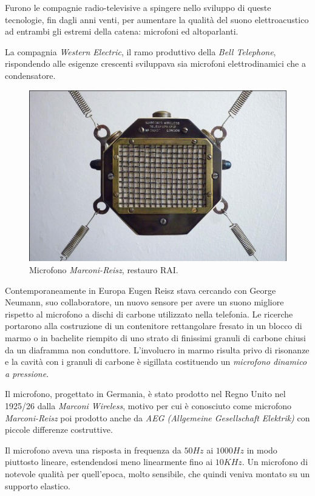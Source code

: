 \begin{refsection}
Furono le compagnie radio-televisive a spingere nello sviluppo di queste tecnologie,
fin dagli anni venti, per aumentare la qualità del suono elettroacustico ad
entrambi gli estremi della catena: microfoni ed altoparlanti.

La compagnia \emph{Western Electric}, il ramo produttivo della \emph{Bell Telephone},
rispondendo alle esigenze crescenti sviluppava sia microfoni elettrodinamici che
a condensatore.

\begin{figure}[t]
\centering
\includegraphics[width=0.99\columnwidth]{CAPITOLI/0200/img/1321872621718Reisz8.jpg}
\caption[]{Microfono \emph{Marconi-Reisz}, restauro RAI.}
\label{mic:Marconi-Reisz}
\end{figure}

Contemporaneamente in Europa Eugen Reisz stava cercando con George Neumann,
suo collaboratore, un nuovo sensore per avere un suono migliore rispetto al
microfono a dischi di carbone utilizzato nella telefonia. Le ricerche portarono alla
costruzione di un contenitore rettangolare fresato in un blocco di marmo o in
bachelite riempito di uno strato di finissimi granuli di carbone chiusi da un
diaframma non conduttore. L’involucro in marmo risulta privo di risonanze e la
cavità con i granuli di carbone è sigillata costituendo un \emph{microfono dinamico a pressione}.

Il microfono, progettato in Germania, è stato prodotto nel Regno Unito nel 1925/26
dalla \emph{Marconi Wireless}, motivo per cui è conosciuto come microfono
\emph{Marconi-Reisz} poi prodotto anche da \emph{AEG (Allgemeine Gesellschaft
Elektrik)} con piccole differenze costruttive.

Il microfono aveva una risposta in frequenza da $50Hz$ ai $1000Hz$ in modo
piuttosto lineare, estendendosi meno linearmente fino ai $10KHz$. Un microfono
di notevole qualità per quell’epoca, molto sensibile, che quindi veniva montato su un supporto elastico.


\end{refsection}
